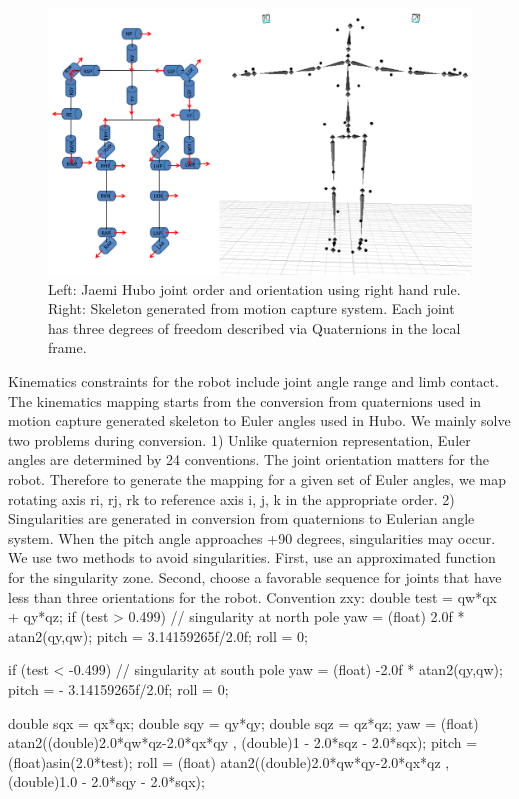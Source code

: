 \begin{figure}[t]
  \centering
\includegraphics[width=1.0\columnwidth]{./pix/mocapJoints.png}
  \caption{Left: Jaemi Hubo joint order and orientation using right hand rule.  Right: Skeleton generated from motion capture system.  Each joint has three degrees of freedom described via Quaternions in the local frame.}
  \label{fig:mocap-joints}
\end{figure}

Kinematics constraints for the robot include joint angle range and limb contact. 
The kinematics mapping starts from the conversion from quaternions used in motion capture generated skeleton to Euler angles used in Hubo. 
We mainly solve two problems during conversion.  1) Unlike quaternion representation, Euler angles are determined by 24 conventions.  The joint orientation matters for the robot.  Therefore to generate the mapping for a given set of Euler angles, we map rotating axis ri, rj, rk to reference axis i, j, k in the appropriate order.  2) Singularities are generated in conversion from quaternions to Eulerian angle system. When the pitch angle approaches +90 degrees, singularities may occur. We use two methods to avoid singularities. First, use an approximated function for the singularity zone. Second, choose a favorable sequence for joints that have less than three orientations for the robot.
Convention zxy: 
double test = qw*qx + qy*qz;
if (test > 0.499) // singularity at north pole
		yaw = (float) 2.0f * atan2(qy,qw);
		pitch = 3.14159265f/2.0f;
		roll = 0;

if (test < -0.499) // singularity at south pole
		yaw = (float) -2.0f * atan2(qy,qw);
		pitch = - 3.14159265f/2.0f;
		roll = 0;
        

    double sqx = qx*qx;
    double sqy = qy*qy;
    double sqz = qz*qz;
yaw = (float) atan2((double)2.0*qw*qz-2.0*qx*qy , (double)1 - 2.0*sqz - 2.0*sqx);
pitch = (float)asin(2.0*test);
roll = (float) atan2((double)2.0*qw*qy-2.0*qx*qz , (double)1.0 - 2.0*sqy - 2.0*sqx);



